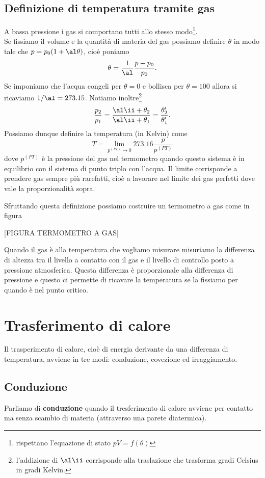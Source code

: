 \subsection{Definizione di temperatura tramite gas}
A bassa pressione i gas si comportano tutti allo stesso modo\footnote{rispettano l'equazione di stato $pV=f(\theta)$}.\\
Se fissiamo il volume e la quantit\`a di materia del gas possiamo definire $\theta$ in modo tale che $p=p_0(1+\al\theta)$, cio\`e poniamo 
\[\theta=\frac1\al\frac{p-p_0}{p_0}.\] 
Se imponiamo che l'acqua congeli per $\theta=0$ e bollisca per $\theta=100$ allora si ricaviamo $1/\al=273.15$. Notiamo inoltre\footnote{l'addizione di $\al\ii$ corrisponde alla traslazione che trasforma gradi Celsius in gradi Kelvin.}
\[\frac{p_2}{p_1}=\frac{\al\ii+\theta_2}{\al\ii +\theta_1}=\frac{\theta_2'}{\theta_1'}.\]
Possiamo dunque definire la temperatura (in Kelvin) come
\[T=\lim_{p^{(PT)}\to 0}273.16 \frac{p}{p^{(PT)}}\]
dove $p^{(PT)}$ \`e la pressione del gas nel termometro quando questo sistema \`e in equilibrio con il sistema di punto triplo con l'acqua. Il limite corrisponde a prendere gas sempre pi\`u rarefatti, cio\`e a lavorare nel limite dei gas perfetti dove vale la proporzionalit\`a sopra.
\medskip

\noindent Sfruttando questa definizione possiamo costruire un termometro a gas come in figura

[FIGURA TERMOMETRO A GAS]

\noindent Quando il gas \`e alla temperatura che vogliamo misurare misuriamo la differenza di altezza tra il livello a contatto con il gas e il livello di controllo posto a pressione atmosferica. Questa differenza \`e proporzionale alla differenza di pressione e questo ci permette di ricavare la temperatura se la fissiamo per quando \`e nel punto critico.


\section{Trasferimento di calore}
Il trasperimento di calore, cio\`e di energia derivante da una differenza di temperatura, avviene in tre modi: conduzione, covezione ed irraggiamento.

\subsection{Conduzione}
Parliamo di \textbf{conduzione} quando il tresferimento di calore avviene per contatto ma senza scambio di materia (attraverso una parete diatermica).\medskip

